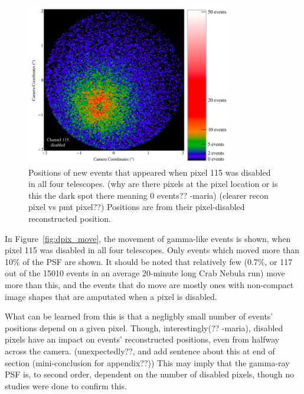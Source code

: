     \begin{figure}[!ht]
      \centering
      \includegraphics[width=0.8\textwidth]{images/disabled_pixel/appearing_events}
      \caption[New Events that Appear when Disabling Camera Pixels]{
        Positions of new events that appeared when pixel 115 was disabled in all four telescopes.
        {\color{red}(why are there pixels at the pixel location or is this the dark spot there meaning 0 events?? -maria)}
        {\color{red}(clearer recon pixel vs pmt pixel??)}
        Positions are from their pixel-disabled reconstructed position.
      }
      \label{fig:dpix_appear}
    \end{figure}

    In Figure~\ref{fig:dpix_move}, the movement of gamma-like events is shown, when pixel 115 was disabled in all four telescopes.
    Only events which moved more than 10\% of the PSF are shown.
    It should be noted that relatively few (0.7\%, or 117 out of the 15010 events in an average 20-minute long Crab Nebula run) move more than this, and the events that do move are mostly ones with non-compact image shapes that are amputated when a pixel is disabled.

    What can be learned from this is that a negligbly small number of events' positions depend on a given pixel.
    Though, interestingly{\color{red}(?? -maria)}, disabled pixels have an impact on events' reconstructed positions, even from halfway across the camera.
    {\color{red}(unexpectedly??, and add sentence about this at end of section (mini-conclusion for appendix??))}
    This may imply that the gamma-ray PSF is, to second order, dependent on the number of disabled pixels, though no studies were done to confirm this.

